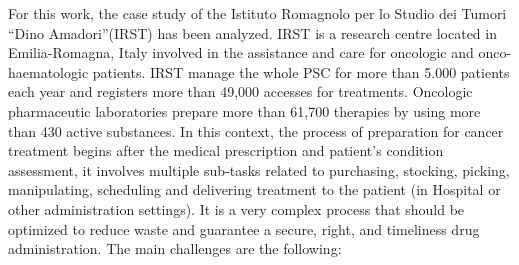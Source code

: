For this work, the case study of the Istituto Romagnolo per lo Studio dei Tumori ``Dino Amadori''(IRST) has been analyzed.  IRST is a research centre located in Emilia-Romagna, Italy involved in the assistance and care for oncologic and onco-haematologic patients. IRST manage the whole PSC for more than 5.000 patients each year and registers more than 49,000 accesses for treatments. Oncologic pharmaceutic laboratories prepare more than 61,700 therapies by using more than 430 active substances. 
%
In this context, the process of preparation for cancer treatment begins after the medical prescription and patient's condition assessment, it involves multiple sub-tasks related to purchasing, stocking, picking, manipulating, scheduling and delivering treatment to the patient (in Hospital or other administration settings). 
%
It is a very complex process that should be optimized to reduce waste and guarantee a secure, right, and timeliness drug administration.
%
The main challenges are the following:
